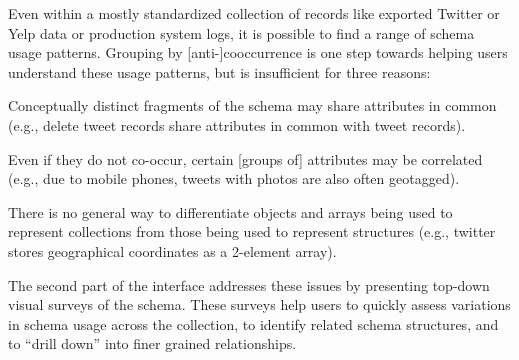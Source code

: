 
Even within a mostly standardized collection of records like exported Twitter or Yelp data or production system logs, it is possible to find a range of schema usage patterns.
Grouping by [anti-]cooccurrence is one step towards helping users understand these usage patterns, but is insufficient for three reasons:
\begin{enumerate*}
  \item Conceptually distinct fragments of the schema may share attributes in common (e.g., delete tweet records share attributes in common with tweet records).
  \item Even if they do not co-occur, certain [groups of] attributes may be correlated (e.g., due to mobile phones, tweets with photos are also often geotagged).
  \item There is no general way to differentiate \json objects and arrays being used to represent collections from those being used to represent structures (e.g., twitter stores geographical coordinates as a 2-element array).
\end{enumerate*}
The second part of the \systemnametwo interface addresses these issues by presenting top-down visual surveys of the schema.
These surveys help users to quickly assess variations in schema usage across the collection, to identify related schema structures, and to ``drill down'' into finer grained relationships.



